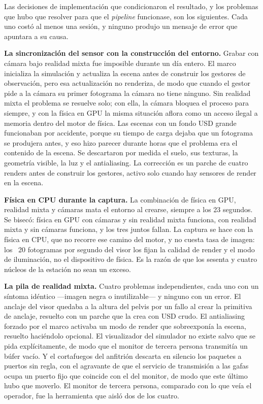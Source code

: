 Las decisiones de implementación que condicionaron el resultado, y los problemas que hubo que
resolver para que el \textit{pipeline} funcionase, son los siguientes. Cada uno costó al menos una sesión, y
ninguno produjo un mensaje de error que apuntara a su causa.

\textbf{La sincronización del sensor con la construcción del entorno.} Grabar con cámara bajo
realidad mixta fue imposible durante un día entero. El marco inicializa la simulación y actualiza la
escena antes de construir los gestores de observación, pero esa actualización no renderiza, de modo
que cuando el gestor pide a la cámara su primer fotograma la cámara no tiene ninguno. Sin realidad
mixta el problema se resuelve solo; con ella, la cámara bloquea el proceso para siempre, y con la
física en GPU la misma situación aflora como un acceso ilegal a memoria dentro del motor de física.
Las escenas con un fondo USD grande funcionaban por accidente, porque su tiempo de carga dejaba que
un fotograma se produjera antes, y eso hizo parecer durante horas que el problema era el contenido
de la escena. Se descartaron por medida el suelo, sus texturas, la geometría visible, la luz y el
antialiasing. La corrección es un parche de cuatro renders antes de construir los gestores, activo
solo cuando hay sensores de render en la escena.

\textbf{Física en CPU durante la captura.} La combinación de física en GPU, realidad mixta y
cámaras mata el entorno al crearse, siempre a los 23 segundos. Se bisecó: física en GPU con cámaras
y sin realidad mixta funciona, con realidad mixta y sin cámaras funciona, y los tres juntos fallan.
La captura se hace con la física en CPU, que no recorre ese camino del motor, y no cuesta tasa de
imagen: los ~20 fotogramas por segundo del visor los fijan la calidad de render y el modo de
iluminación, no el dispositivo de física. Es la razón de que los sesenta y cuatro núcleos de la
estación no sean un exceso.

\textbf{La pila de realidad mixta.} Cuatro problemas independientes, cada uno con un síntoma
idéntico —imagen negra o inutilizable— y ninguno con un error. El anclaje del visor quedaba a la
altura del pelvis por un fallo al crear la primitiva de anclaje, resuelto con un parche que la crea
con USD crudo. El antialiasing forzado por el marco activaba un modo de render que sobreexponía la
escena, resuelto haciéndolo opcional. El visualizador del simulador no existe salvo que se pida
explícitamente, de modo que el monitor de tercera persona transmitía un búfer vacío. Y el cortafuegos
del anfitrión descarta en silencio los paquetes a puertos sin regla, con el agravante de que el
servicio de transmisión a las gafas ocupa un puerto fijo que coincide con el del monitor, de modo
que este último hubo que moverlo. El monitor de tercera persona, comparado con lo que veía el
operador, fue la herramienta que aisló dos de los cuatro.

